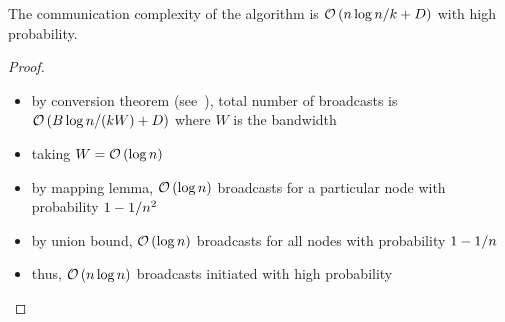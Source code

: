 \begin{frame}
    \begin{lemma}
        The communication complexity of the algorithm is $\mathcal{O}\left(n\log n/k + D\right)$
        with high probability.
    \end{lemma}
    \begin{proof}
        \begin{itemize}
            \item by conversion theorem (see~), total number of broadcasts is $\mathcal{O}\left(B\log{n} / (kW) + D\right)$ where $W$ is the bandwidth
            \item taking $W = \mathcal{O}\left(\log{n}\right)$
            \item by mapping lemma, $\mathcal{O}\left(\log{n}\right)$ broadcasts for a particular
                  node with probability $1 - 1 / n^2$
            \item by union bound, $\mathcal{O}\left(\log{n}\right)$ broadcasts for all nodes with
                  probability $1 - 1 / n$
            \item thus, $\mathcal{O}\left(n\log{n}\right)$ broadcasts initiated with high probability
        \end{itemize}
    \end{proof}
\end{frame}